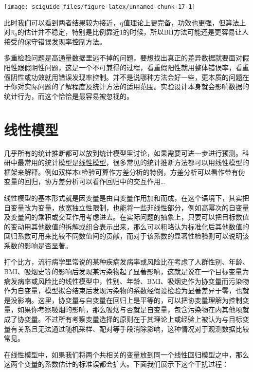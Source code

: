 \documentclass[]{tufte-book}
\begin{document}
\texttt{[image: sciguide\_files/figure-latex/unnamed-chunk-17-1]}

此时我们可以看到两者结果较为接近，q值理论上更完备，功效也更强，但算法上对\(\hat\pi_0\)的估计并不稳定，特别是比例靠近1的时候，所以BH方法可能还是更容易让人接受的保守错误发现率控制方法。

多重检验问题是高通量数据里逃不掉的问题，要想找出真正的差异数据就要面对假阳性跟假阴性问题，这是一个不可兼得的过程，看重假阳性就用整体错误率，看重假阴性或功效就用错误发现率控制。并不是说哪种方法会好一些，更本质的问题在于你对实际问题的了解程度及统计方法的适用范围。实验设计本身就会影响数据的统计行为，而这个恰恰是最容易被忽视的。

\hypertarget{ux7ebfux6027ux6a21ux578b}{%
\section{线性模型}\label{ux7ebfux6027ux6a21ux578b}}

几乎所有的统计推断都可以放到统计模型里讨论，如果需要可进一步进行预测。科研中最常用的统计模型是\href{https://cosx.org/2019/09/common-tests-as-linear-models/}{线性模型}，很多常见的统计推断方法都可以用线性模型的框架来解释。例如双样本t检验可算作方差分析的特例，方差分析可以看作带有伪变量的回归，协方差分析可以看作回归中的交互作用\ldots{}

线性模型的基本形式就是因变量是由自变量作用加和而成，在这个语境下，其实把自变量改为变量，放宽独立性限制，也能将一些非线性部分，例如高幂次的自变量及变量间的乘积或交互作用考虑进去。在实际问题的抽象上，只要可以把目标数值的变动用其他数值的拆解或组合表示出来，那么可以粗略认为标准化后其他数值的回归系数可用来比较不同数值间的贡献，而对于该系数的显著性检验则可以说明该系数的影响是否显著。

打个比方，流行病学里常说的某种疾病发病率或风险比在考虑了人群性别、年龄、BMI、吸烟史等的影响后发现某污染物起了显著影响，这就是说在一个目标变量为病发病率或风险比的线性模型中，性别、年龄、BMI、吸烟史作为协变量而污染物作为自变量，模型拟合结束后发现污染物的系数经假设检验为显著差异于零，也就是没影响。这里，协变量与自变量在回归上是平等的，可以把协变量理解为控制变量，如果你考察吸烟的影响，那么吸烟与否就是自变量，包含污染物在内其他项就成了协变量。不过所有考察变量选择的原则在于其理论上或经验上被认为与目标变量有关系且无法通过随机采样、配对等手段消除影响，这种情况对于观测数据比较常见。

在线性模型中，如果我们将两个共相关的变量放到同一个线性回归模型之中，那么这两个变量的系数估计的标准误都会扩大。下面我们展示下这个干扰过程：
\end{document}
